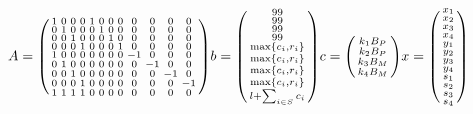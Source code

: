 \documentclass{article}
\begin{document}
\begin{align*}
A = \begin{psmallmatrix}
        1 & 0 & 0 & 0 & 1 & 0 & 0 & 0 & 0 & 0 & 0 & 0 \\
        0 & 1 & 0 & 0 & 0 & 1 & 0 & 0 & 0 & 0 & 0 & 0 \\
        0 & 0 & 1 & 0 & 0 & 0 & 1 & 0 & 0 & 0 & 0 & 0 \\
        0 & 0 & 0 & 1 & 0 & 0 & 0 & 1 & 0 & 0 & 0 & 0 \\
        1 & 0 & 0 & 0 & 0 & 0 & 0 & 0 & -1 & 0 & 0 & 0 \\
        0 & 1 & 0 & 0 & 0 & 0 & 0 & 0 & 0 & -1 & 0 & 0 \\
        0 & 0 & 1 & 0 & 0 & 0 & 0 & 0 & 0 & 0 & -1 & 0 \\
        0 & 0 & 0 & 1 & 0 & 0 & 0 & 0 & 0 & 0 & 0 & -1 \\
        1 & 1 & 1 & 1 & 0 & 0 & 0 & 0 & 0 & 0 & 0 & 0 
    \end{psmallmatrix}
b = \begin{psmallmatrix}
    99\\99\\99\\99\\ \max\{c_i, r_i\}\\ \max\{c_i, r_i\} \\ \max\{c_i, r_i\} \\ \max\{c_i, r_i\} \\ l + \sum_{i \in S} c_i
\end{psmallmatrix}
c = 
\begin{psmallmatrix}
    k_1 B_P \\
    k_2 B_P  \\
    k_3 B_M \\
    k_4 B_M
\end{psmallmatrix}
x = \begin{psmallmatrix}
    x_1 \\
    x_2 \\
    x_3 \\
    x_4 \\
    y_1 \\
    y_2 \\
    y_3 \\
    y_4 \\
    s_1 \\
    s_2 \\
    s_3 \\
    s_4
\end{psmallmatrix}
\end{align*}
\end{document}
